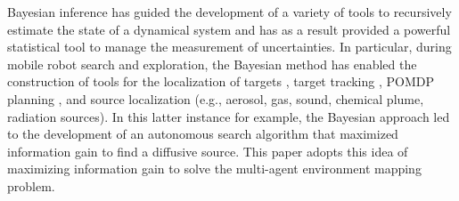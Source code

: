 \documentclass[letterpaper, 10 pt, conference]{ieeeconf}
\newcommand{\Ram}[1]{{\normalsize{\textbf{({\color{green}Ram:\ }#1)}}}}
\newcommand{\HJ}[1]{{\color{black}{#1}}}
\newcommand{\HJP}[1]{{\normalsize{\textbf{({\color{blue}Hyongju:\ }#1)}}}}
\begin{document}
Bayesian inference has guided the development of a variety of tools to recursively estimate the state of a dynamical system and has as a result provided a powerful statistical tool to manage the measurement of uncertainties.
In particular, during mobile robot search and exploration, the Bayesian method has enabled the construction of tools for the localization of targets \cite{bourgault2003coordinated}, target tracking \cite{stone2013bayesian}, POMDP planning \cite{candido2010exploiting}, and source localization \cite{ristic2010information,valin2007robust} (e.g., aerosol, gas, sound, chemical plume, radiation sources). 
In this latter instance for example,  the Bayesian approach led to the development of an autonomous search algorithm that maximized information gain to find a diffusive source\cite{ristic2010information}.
This paper adopts this idea of maximizing information gain to solve the multi-agent environment mapping problem. 

\end{document}
